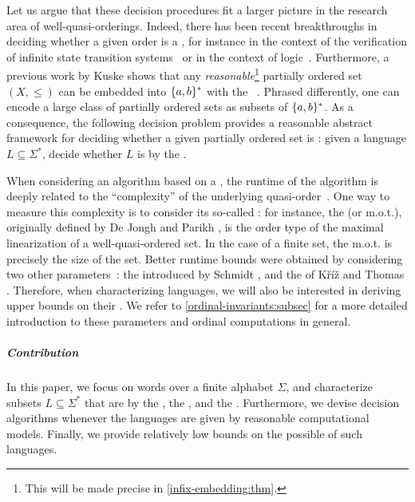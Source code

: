 \AP Let us argue that these decision procedures fit a larger picture in the
research area of well-quasi-orderings.
Indeed, there has been recent breakthroughs in deciding whether a given order
is a , for instance in the context of the verification of
infinite state transition systems~\cite{DBLP:conf/fsttcs/FinkelG19} or in the
context of logic~\cite{DBLP:journals/pacmpl/BergstrasserGLZ24}.
Furthermore, a previous work by Kuske shows that any
\emph{reasonable}\footnote{ This will be made precise in
\cref{infix-embedding:thm}. } partially ordered set $(X, \leq)$ can
be embedded into $\{ a,b \}^*$ with the ~\cite[Lemma
5.1]{DBLP:journals/ita/Kuske06}. Phrased differently, one can encode a large
class of partially ordered sets as subsets of $\{ a,b \}^*$. As a consequence,
the following decision problem provides a reasonable abstract framework for
deciding whether a given partially ordered set is :
given a language $L \subseteq \Sigma^*$, decide whether $L$ is
 by the .

\AP When considering an algorithm based on a , the
runtime of the algorithm is deeply related to the ``complexity'' of the
underlying quasi-order~\cite{SCHMITZ17}. One way to measure this complexity is
to consider its so-called : for instance, the
 (or m.o.t.), originally defined by De Jongh and Parikh
\cite{dejongh77}, is the order type of the maximal linearization of a
well-quasi-ordered set. In the case of a finite set, the m.o.t. is precisely
the size of the set. Better runtime bounds were obtained by considering two
other parameters~\cite{SCHMITZ19}: the  introduced by
Schmidt \cite{schmidt81}, and the  of Kříž and Thomas
\cite{kriz90b}. Therefore, when characterizing 
languages, we will also be interested in deriving upper bounds on their
. We refer to \cref{ordinal-invariants:subsec} for a
more detailed introduction to these parameters and ordinal computations in
general.

\subparagraph{Contribution} In this paper, we focus on words over a finite
alphabet $\Sigma$, and characterize subsets $L \subseteq \Sigma^*$ that are
 by the , the ,
and the . Furthermore, we devise decision algorithms
whenever the languages are given by reasonable computational models. Finally,
we provide relatively low bounds on the possible  of
such languages.

